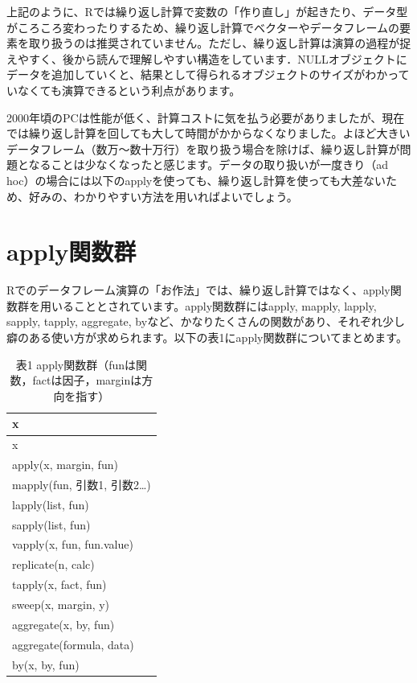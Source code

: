 \documentclass[
  letterpaper,
  DIV=11,
  numbers=noendperiod]{scrreprt}
\begin{document}
上記のように、Rでは繰り返し計算で変数の「作り直し」が起きたり、データ型がころころ変わったりするため、繰り返し計算でベクターやデータフレームの要素を取り扱うのは推奨されていません。ただし、繰り返し計算は演算の過程が捉えやすく、後から読んで理解しやすい構造をしています．NULLオブジェクトにデータを追加していくと、結果として得られるオブジェクトのサイズがわかっていなくても演算できるという利点があります。

2000年頃のPCは性能が低く、計算コストに気を払う必要がありましたが、現在では繰り返し計算を回しても大して時間がかからなくなりました。よほど大きいデータフレーム（数万～数十万行）を取り扱う場合を除けば、繰り返し計算が問題となることは少なくなったと感じます。データの取り扱いが一度きり（ad
hoc）の場合には以下のapplyを使っても、繰り返し計算を使っても大差ないため、好みの、わかりやすい方法を用いればよいでしょう。

\hypertarget{applyux95a2ux6570ux7fa4-1}{%
\section{apply関数群}\label{applyux95a2ux6570ux7fa4-1}}

Rでのデータフレーム演算の「お作法」では、繰り返し計算ではなく、apply関数群を用いることとされています。apply関数群にはapply,
mapply, lapply, sapply, tapply, aggregate,
byなど、かなりたくさんの関数があり、それぞれ少し癖のある使い方が求められます。以下の表1にapply関数群についてまとめます。

\begin{longtable}[]{@{}l@{}}
\caption{表1
apply関数群（funは関数，factは因子，marginは方向を指す）}\tabularnewline
\toprule()
x \\
\midrule()
\endfirsthead
\toprule()
x \\
\midrule()
\endhead
apply(x, margin, fun) \\
mapply(fun, 引数1, 引数2\ldots) \\
lapply(list, fun) \\
sapply(list, fun) \\
vapply(x, fun, fun.value) \\
replicate(n, calc) \\
tapply(x, fact, fun) \\
sweep(x, margin, y) \\
aggregate(x, by, fun) \\
aggregate(formula, data) \\
by(x, by, fun) \\
\bottomrule()
\end{longtable}
\end{document}
